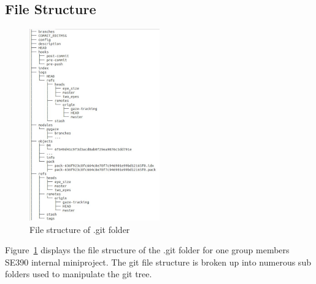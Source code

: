 \documentclass[12pt]{article}
\begin{document}
\subsection{File Structure}
\begin{figure}[htbp]
\centering
\includegraphics[width=0.5\textwidth]{filestructure.jpeg}
\caption{File structure of .git folder}
\label{fig:file}
\end{figure}

Figure~\ref{fig:file} displays the file structure of the .git folder for one group members SE390 internal miniproject. The git file structure is broken up into numerous sub folders used to manipulate the git tree.
\end{document}
